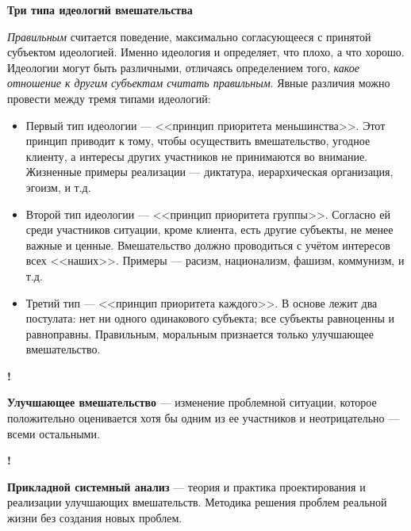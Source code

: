 \documentclass{article}
\newcommand{\note}[1]{\textit{#1}}
\renewcommand{\subsection}[1]{
	\vspace{2em}
	\begin{flushright}
		\large
		\textbf{#1}
	\end{flushright}
	}
\newcommand{\define}[2]{
	\textbf{#1} --- #2
	}
\newcommand{\definewithmark}[2]{
	\begin{flushright}\textbf{!}\hspace{2ex}\vline\hspace{2ex}
		\begin{minipage}{0.9\textwidth}
			\define{#1}{#2}
		\end{minipage}
	\end{flushright}
	}
\begin{document}
\subsection{Три типа идеологий вмешательства}
\note{Правильным} считается поведение, максимально согласующееся с принятой субъектом идеологией. Именно идеология и определяет, что плохо, а что хорошо. Идеологии могут быть различными, отличаясь определением того, \note{какое отношение к другим субъектам считать правильным}. Явные различия можно провести между тремя типами идеологий:
\begin{itemize}
	\item Первый тип идеологии --- <<принцип приоритета меньшинства>>. Этот принцип приводит к тому, чтобы осуществить вмешательство, угодное клиенту, а интересы других участников не принимаются во внимание. Жизненные примеры реализации --- диктатура, иерархическая организация, эгоизм, и т.д.
	\item Второй тип идеологии --- <<принцип приоритета группы>>. Согласно ей среди участников ситуации, кроме клиента, есть другие субъекты, не менее важные и ценные. Вмешательство должно проводиться с учётом интересов всех <<наших>>. Примеры --- расизм, национализм, фашизм, коммунизм, и т.д.
	\item Третий тип --- <<принцип приоритета каждого>>. В основе лежит два постулата: нет ни одного одинакового субъекта; все субъекты равноценны и равноправны. Правильным, моральным признается только улучшающее вмешательство.
\end{itemize}
\definewithmark{Улучшающее вмешательство}{изменение проблемной ситуации, которое положительно оценивается хотя бы одним из ее участников и неотрицательно --- всеми остальными.}
\definewithmark{Прикладной системный анализ}{теория и практика проектирования и реализации улучшающих вмешательств. Методика решения проблем реальной жизни без создания новых проблем.}
\end{document}

